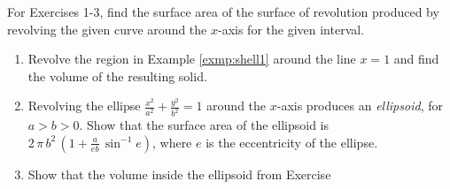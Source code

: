 {\small
{}
\par\noindent For Exercises 1-3, find the surface area of the surface of
revolution produced by revolving the given curve around the $x$-axis for the
given interval.
\begin{enumerate}[\bfseries 1.]
\par\noindent For Exercises 4-6, find the volume of the solid of revolution
produced by revolving the region between the given curve and the $x$-axis around
the $x$-axis for the given interval.
[{[\bfseries 1.]}]
\par\noindent For Exercises 7-9, find the volume of the solid of revolution
produced by revolving the region between the given curve and the $x$-axis around
the $y$-axis for the given interval.
[{[\bfseries 1.]}]
 \item Revolve the region in Example \ref{exmp:shell1} around the line $x=1$ and
  find the volume of the resulting solid.
 \item\label{exer:ellipsoid} Revolving the ellipse
  $\frac{x^2}{a^2}+\frac{y^2}{b^2}=1$ around the $x$-axis produces an
  \emph{ellipsoid}, for $a>b>0$. Show that the surface area of the ellipsoid is
  $2\,\pi\,b^2\,\left(1 + \frac{a}{eb}\,\sin^{-1} e\right)$, where $e$ is the
  eccentricity of the ellipse.
 \item Show that the volume inside the ellipsoid from Exercise

\end{enumerate}}
